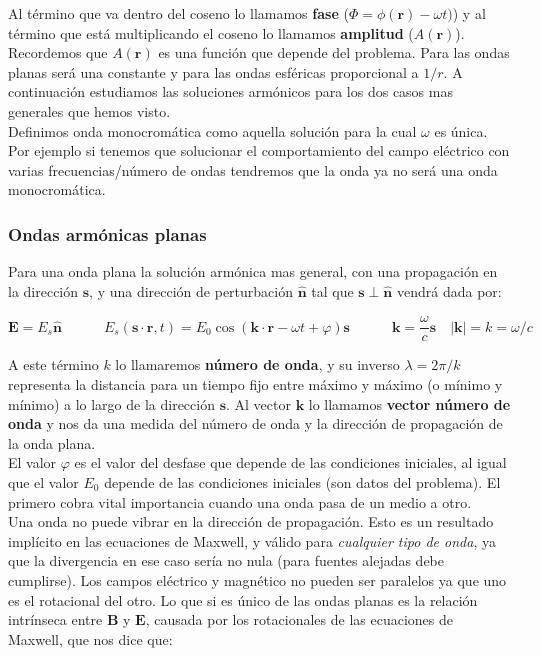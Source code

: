 \documentclass[12pt,a4paper]{article}
\newcommand{\tquad}{\quad \quad \quad}
\newcommand{\Bn}{\mathbf{B}}
\newcommand{\En}{\mathbf{E}}
\newcommand{\kn}{\mathbf{k}}
\newcommand{\rn}{\mathbf{r}}
\newcommand{\sn}{\mathbf{s}}
\newcommand{\hnn}{\hat{\mathbf{n}}}
\numberwithin{equation}{section}
\numberwithin{figure}{section}
\begin{document}
Al término que va dentro del coseno lo llamamos \textbf{fase} ($\Phi = \phi(\rn) - \omega t)$) y al término que está multiplicando el coseno lo llamamos \textbf{amplitud} ($A(\rn)$). \\

Recordemos que $A(\rn)$ es una función que depende del problema. Para las ondas planas será una constante y para las ondas esféricas proporcional a $1/r$. A continuación estudiamos las soluciones armónicos para los dos casos mas generales que hemos visto.  \\

Definimos onda monocromática como aquella solución para la cual $\omega$ es única. Por ejemplo si tenemos que solucionar el comportamiento del campo eléctrico con varias frecuencias/número de ondas tendremos que la onda ya no será una onda monocromática.

\subsubsection{Ondas armónicas planas}

Para una onda plana la solución armónica mas general, con una propagación en la dirección $\sn$, y una dirección de perturbación $\hnn$ tal que $\sn \perp \hnn$ vendrá dada por:

\begin{equation}
\En = E_s \hnn \tquad E_s(\sn\cdot\rn,t) = E_0 \cos ( \kn \cdot \rn - \omega t + \varphi) \sn  \tquad \kn = \frac{\omega}{c} \sn \quad |\kn| = k = \omega / c
\end{equation}

A este término $k$ lo llamaremos \textbf{número de onda}, y su inverso $\lambda = 2 \pi / k$ representa la distancia para un tiempo fijo entre máximo y máximo (o mínimo y mínimo) a lo largo de la dirección $\sn$. Al vector $\kn$ lo llamamos \textbf{vector número de onda} y nos da una medida del número de onda y la dirección de propagación de la onda plana.  \\


 El valor $\varphi$ es el valor del desfase que depende de las condiciones iniciales, al igual que el valor $E_0$ depende de las condiciones iniciales (son datos del problema). El primero cobra vital importancia cuando una onda pasa de un medio a otro.  \\
 
 
Una onda no puede vibrar en la dirección de propagación. Esto es un resultado implícito en las ecuaciones de Maxwell, y válido para \textit{cualquier tipo de onda}, ya que la divergencia en ese caso sería no nula (para fuentes alejadas debe cumplirse). Los campos eléctrico y magnético no pueden ser paralelos ya que uno es el rotacional del otro. Lo que si es único de las ondas planas es la relación intrínseca entre $\Bn$ y $\En$, causada por los rotacionales de las ecuaciones de Maxwell, que nos dice que:
\end{document}
